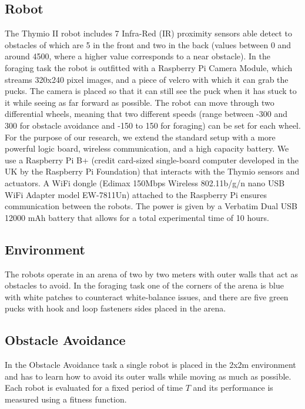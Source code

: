 \documentclass{article}
\begin{document}
	\subsection{Robot} %
	\label{sub:Robot}
	The Thymio II robot includes 7 Infra-Red (IR) proximity sensors able detect
	to obstacles of which are 5 in the front and two in the back (values
	between 0 and around 4500, where a higher value corresponds to a near
	obstacle).
	In the foraging task the robot is outfitted with a Raspberry Pi Camera
	Module, which streams 320x240 pixel images, and a piece of velcro with
	which it can grab the pucks. The camera is placed so that it can still see
	the puck when it has stuck to it while seeing as far forward as possible.
	The robot can move through two differential wheels, meaning that two
	different speeds (range between -300 and 300 for obstacle avoidance and
	-150 to 150 for foraging) can be set for each wheel. For the purpose of our
	research, we extend the standard setup with a more powerful logic board,
	wireless communication, and a high capacity battery. We use a Raspberry Pi
	B+ (credit card-sized single-board computer developed in the UK by the
	Raspberry Pi Foundation) that interacts with the Thymio sensors and
	actuators. A WiFi dongle (Edimax 150Mbps Wireless 802.11b/g/n nano USB WiFi
	Adapter model EW-7811Un) attached to the Raspberry Pi ensures communication
	between the robots. The power is given by a Verbatim Dual USB 12000 mAh
	battery that allows for a total experimental time of 10 hours.

	\subsection{Environment} %
	\label{sub:Environment}
	The robots operate in an arena of two by two meters with outer walls that
	act as obstacles to avoid.
	In the foraging task one of the corners of the arena is blue with white
	patches to counteract white-balance issues, and there are five green pucks
	with hook and loop fasteners sides placed in the arena.

	\subsection{Obstacle Avoidance} %
	\label{sub:Obstacle Avoidance}
	In the Obstacle Avoidance task a single robot is placed in the
	2x2m environment and has to learn how to avoid its outer walls while moving
	as much as possible. Each robot is evaluated for a fixed period of time $T$
	and its performance is measured using a fitness function.
\end{document}
